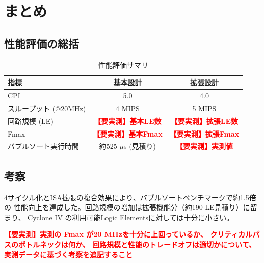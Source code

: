 \documentclass[a4paper,11pt]{ltjsarticle}
\newcommand{\measured}[1]{\textcolor{red}{\textbf{【要実測】#1}}}
\begin{document}
\section{まとめ}

\subsection{性能評価の総括}

\begin{table}[h]
\centering
\caption{性能評価サマリ}
\begin{tabular}{lcc}
\toprule
指標 & 基本設計 & 拡張設計 \\
\midrule
CPI & 5.0 & 4.0 \\
スループット (@20MHz) & 4 MIPS & 5 MIPS \\
回路規模 (LE) & \measured{基本LE数} & \measured{拡張LE数} \\
Fmax & \measured{基本Fmax} & \measured{拡張Fmax} \\
バブルソート実行時間 & 約525 $\mu$s (見積り) & \measured{実測値} \\
\bottomrule
\end{tabular}
\end{table}

\subsection{考察}

4サイクル化とISA拡張の複合効果により、バブルソートベンチマークで約1.5倍の
性能向上を達成した。回路規模の増加は拡張機能分（約190 LE見積り）に留まり、
Cyclone IV の利用可能Logic Elementsに対しては十分に小さい。

\measured{実測の Fmax が20 MHzを十分に上回っているか、
クリティカルパスのボトルネックは何か、
回路規模と性能のトレードオフは適切かについて、
実測データに基づく考察を追記すること}
\end{document}
